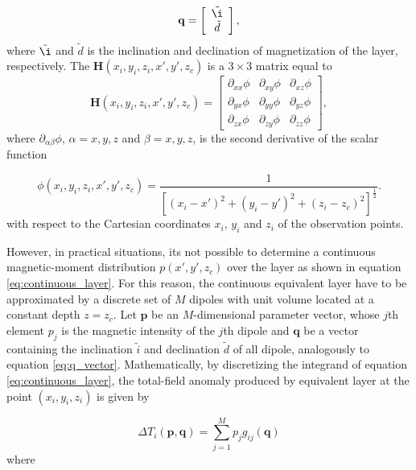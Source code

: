 \begin{equation}
	\mathbf{q} =
	\left[ \begin{array}{c}
		\tilde{\i} \\ 
		\tilde{d} 
	\end{array} \right] ,
	\label{eq:q_vector}
\end{equation}
where $\tilde{\i} $ and $\tilde{d} $ is the inclination and declination of magnetization of the layer, respectively. The $\mathbf{H}(x_i,y_i,z_i,x',y',z_c)$ is a $3 \times 3$ matrix equal to  
\begin{equation}
   \mathbf{H}(x_i,y_i,z_i,x',y',z_c) =
   \left[ \begin{array}{ccc}
   \partial_{xx} \phi & \partial_{xy} \phi &\partial_{xz} \phi \\  \partial_{yx} \phi & \partial_{yy} \phi &\partial_{yz} \phi \\  \partial_{zx} \phi &\partial_{zy}\phi  & \partial_{zz} \phi    
   \end{array} \right] ,
   \label{eq:H}
\end{equation}
where $\partial_{\alpha \beta} \phi$, $\alpha = x, y, z$ and $\beta = x, y, z$, is the second derivative of the scalar function 

\begin{equation}
   \phi (x_i,y_i,z_i,x',y',z_c) = \frac{1}{[(x_i-x')^2 + (y_i-y')^2 + (z_i-z_c)^2]^{\frac{1}{2}}} .
   \label{eq:phi}
 \end{equation}
with respect to the Cartesian coordinates $x_i$, $y_i$ and $z_i$ of the observation points.  

However, in practical situations, its not possible to determine a continuous magnetic-moment distribution $p(x',y',z_c)$ over the layer as shown in equation \ref{eq:continuous_layer}. For this reason, the continuous equivalent layer have to be approximated  by a discrete set of $M$ dipoles with unit volume located at a constant depth $z = z_c$. Let $\mathbf{p}$ be an $M$-dimensional parameter vector, whose $j$th element $p_j$ is the magnetic intensity of the $j$th dipole and $\mathbf{q}$ be a vector containing the inclination $\tilde{i}$ and declination $\tilde{d}$ of all dipole, analogously to equation \ref{eq:q_vector}. Mathematically, by discretizing the integrand of equation \ref{eq:continuous_layer}, the total-field anomaly produced by equivalent layer at the point $(x_i,y_i,z_i)$ is given by     

\begin{equation}
\Delta T_i (\mathbf{p},\mathbf{q}) = \sum_{j=1}^{M} p_j g_{ij} (\mathbf{q})
\label{eq:tfa_pred_pos_i}
\end{equation}    
where 


